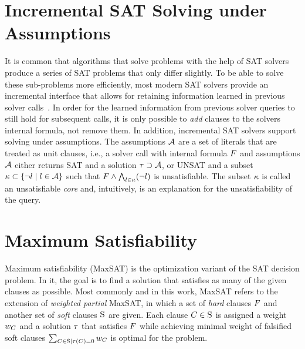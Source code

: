 \section{Incremental SAT Solving under Assumptions\label{sec:inc-sat}}

It is common that algorithms that solve problems with the help of SAT solvers produce a series of SAT problems that only differ slightly.
To be able to solve these sub-problems more efficiently, most modern SAT solvers provide an incremental interface that allows for retaining information learned in previous solver calls~\autocite{DBLP:journals/entcs/EenS03,handbook2-cdcl}.
In order for the learned information  from previous solver queries to still hold for subsequent calls, it is only possible to \emph{add} clauses to the solvers internal formula, not remove them.
In addition, incremental SAT solvers support solving under assumptions.
The assumptions $\mathcal{A}$ are a set of literals that are treated as unit clauses, i.e., a solver call with internal formula $F$ and assumptions $\mathcal{A}$ either returns SAT and a solution $\tau \supset \mathcal{A}$, or UNSAT and a subset $\kappa \subset \{\lnot l \mid l\in\mathcal{A}\}$ such that $F \land \bigwedge_{l \in \kappa} (\lnot l)$ is unsatisfiable.
The subset $\kappa$ is called an unsatisfiable \emph{core} and, intuitively, is an explanation for the unsatisfiability of the query.


\section{Maximum Satisfiability\label{sec:max-sat}}

Maximum satisfiability (MaxSAT) is the optimization variant of the SAT decision problem.
In it, the goal is to find a solution that satisfies as many of the given clauses as possible.
Most commonly and in this work, MaxSAT refers to the extension of \emph{weighted partial} MaxSAT, in which a set of \emph{hard} clauses $F$ and another set of \emph{soft} clauses $\textsc{S}$ are given.
Each clause $C \in \textsc{S}$ is assigned a weight $w_C$ and a solution $\tau$ that satisfies $F$ while achieving minimal weight of falsified soft clauses $\sum_{C\in\textsc{S} \mid \tau(C)=0} w_C$ is optimal for the problem.

